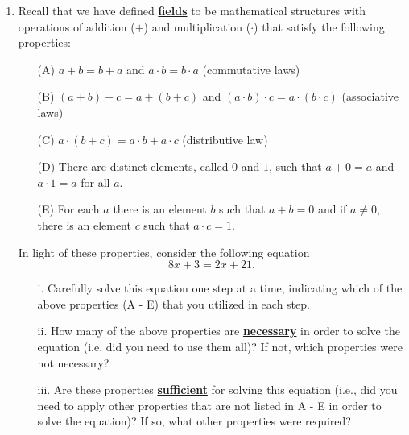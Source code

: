 \documentclass[11pt]{article}
\renewcommand\emph[1]{\underline{\bf{#1}}} %
\theoremstyle{definition}
\begin{document}
\begin{enumerate}
\item   Recall that we have defined \emph{fields} to be mathematical structures with operations of addition ($+$) and multiplication ($\cdot$) that satisfy the following properties:
  \begin{itemize}
    \item[(A)] $a+b=b+a$ and $a\cdot b=b\cdot a$ (commutative laws)
    \item[(B)] $(a+b)+c = a + (b+c)$ and $(a\cdot b)\cdot c = a\cdot (b \cdot c)$ (associative laws)
    \item[(C)] $a\cdot (b+c) = a\cdot b + a \cdot c$ (distributive law)
    \item[(D)] There are distinct elements, called $0$ and $1$, such that $a+0 = a $ and $a \cdot 1 = a$ for all $a$.
    \item[(E)] For each $a$ there is an element $b$ such that $a + b = 0$ and if $a\neq 0$, there is an element $c$ such that $a\cdot c = 1$.
  \end{itemize}
  In light of these properties, consider the following equation       
      \[8x+3=2x+21.\]
  \begin{itemize}
    \item[i.] Carefully solve this equation one step at a time, indicating which of the above properties (A - E) that you utilized in each step. 
    \item[ii.]How many of the above properties are \emph{necessary} in order to solve the equation (i.e. did you need to use them all)? If not, which properties were not necessary?
    \item[iii.] Are these properties \emph{sufficient} for solving this equation (i.e., did you need to apply other properties that are not listed in A - E in order to solve the equation)? If so, what other properties were required? 
  \end{itemize}


\end{enumerate}
\end{document}
